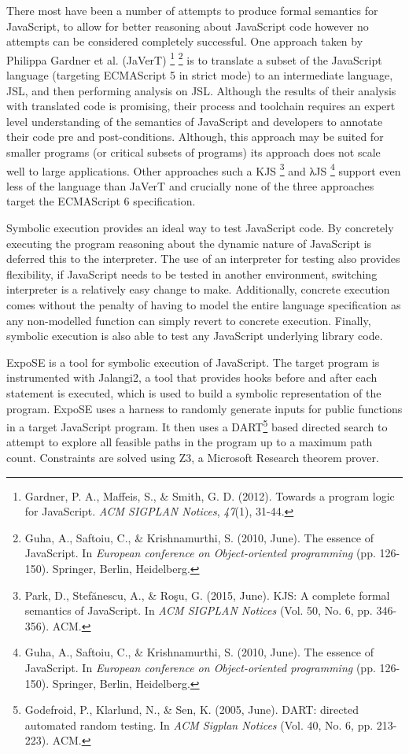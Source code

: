 \documentclass[]{article}
\begin{document}
There most have been a number of attempts to produce formal semantics
for JavaScript, to allow for better reasoning about JavaScript code
however no attempts can be considered completely successful. One
approach taken by Philippa Gardner et al. (JaVerT) \footnote{Gardner, P.
  A., Maffeis, S., \& Smith, G. D. (2012). Towards a program logic for
  JavaScript. \emph{ACM SIGPLAN Notices}, \emph{47}(1), 31-44.}
\footnote{Guha, A., Saftoiu, C., \& Krishnamurthi, S. (2010, June). The
  essence of JavaScript. In \emph{European conference on Object-oriented
  programming} (pp. 126-150). Springer, Berlin, Heidelberg.} is to
translate a subset of the JavaScript language (targeting ECMAScript 5 in
strict mode) to an intermediate language, JSL, and then performing
analysis on JSL. Although the results of their analysis with translated
code is promising, their process and toolchain requires an expert level
understanding of the semantics of JavaScript and developers to annotate
their code pre and post-conditions. Although, this approach may be
suited for smaller programs (or critical subsets of programs) its
approach does not scale well to large applications. Other approaches
such a KJS \footnote{Park, D., Stefănescu, A., \& Roşu, G. (2015, June).
  KJS: A complete formal semantics of JavaScript. In \emph{ACM SIGPLAN
  Notices} (Vol. 50, No. 6, pp. 346-356). ACM.} and λJS \footnote{Guha,
  A., Saftoiu, C., \& Krishnamurthi, S. (2010, June). The essence of
  JavaScript. In \emph{European conference on Object-oriented
  programming} (pp. 126-150). Springer, Berlin, Heidelberg.} support
even less of the language than JaVerT and crucially none of the three
approaches target the ECMAScript 6 specification.

Symbolic execution provides an ideal way to test JavaScript code. By
concretely executing the program reasoning about the dynamic nature of
JavaScript is deferred this to the interpreter. The use of an
interpreter for testing also provides flexibility, if JavaScript needs
to be tested in another environment, switching interpreter is a
relatively easy change to make. Additionally, concrete execution comes
without the penalty of having to model the entire language specification
as any non-modelled function can simply revert to concrete execution.
Finally, symbolic execution is also able to test any JavaScript
underlying library code.

ExpoSE is a tool for symbolic execution of JavaScript. The target
program is instrumented with Jalangi2, a tool that provides hooks before
and after each statement is executed, which is used to build a symbolic
representation of the program. ExpoSE uses a harness to randomly
generate inputs for public functions in a target JavaScript program. It
then uses a DART\footnote{Godefroid, P., Klarlund, N., \& Sen, K. (2005,
  June). DART: directed automated random testing. In \emph{ACM Sigplan
  Notices} (Vol. 40, No. 6, pp. 213-223). ACM.} based directed search to
attempt to explore all feasible paths in the program up to a maximum
path count. Constraints are solved using Z3, a Microsoft Research
theorem prover.
\end{document}
